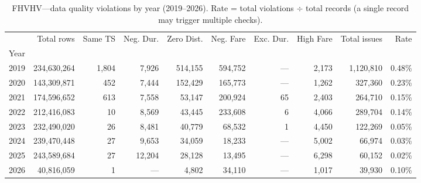 \begin{table}
\caption{FHVHV---data quality violations by year (2019--2026). Rate = total violations $\div$ total records (a single record may trigger multiple checks).}
\label{tab:t2_fhvhv_tripdata}
\begin{tabular}{rrrrrrrrrr}
\toprule
 & Total rows & Same TS & Neg. Dur. & Zero Dist. & Neg. Fare & Exc. Dur. & High Fare & Total issues & Rate \\
Year &  &  &  &  &  &  &  &  &  \\
\midrule
2019 & 234,630,264 & 1,804 & 7,926 & 514,155 & 594,752 & --- & 2,173 & 1,120,810 & 0.48\% \\
2020 & 143,309,871 & 452 & 7,444 & 152,429 & 165,773 & --- & 1,262 & 327,360 & 0.23\% \\
2021 & 174,596,652 & 613 & 7,558 & 53,147 & 200,924 & 65 & 2,403 & 264,710 & 0.15\% \\
2022 & 212,416,083 & 10 & 8,569 & 43,445 & 233,608 & 6 & 4,066 & 289,704 & 0.14\% \\
2023 & 232,490,020 & 26 & 8,481 & 40,779 & 68,532 & 1 & 4,450 & 122,269 & 0.05\% \\
2024 & 239,470,448 & 27 & 9,653 & 34,059 & 18,233 & --- & 5,002 & 66,974 & 0.03\% \\
2025 & 243,589,684 & 27 & 12,204 & 28,128 & 13,495 & --- & 6,298 & 60,152 & 0.02\% \\
2026 & 40,816,059 & 1 & --- & 4,802 & 34,110 & --- & 1,017 & 39,930 & 0.10\% \\
\bottomrule
\end{tabular}
\end{table}
